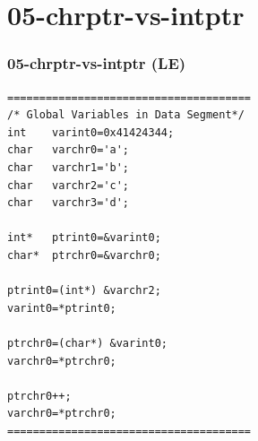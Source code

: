 \documentclass[xcolor=table, notheorems, hyperref={pdfpagelabels=false}]{beamer}
\begin{document}
\begin{frame}[fragile]
\begin{minipage}[t]{120mm}
\end{minipage}

\end{frame}

\section{05-chrptr-vs-intptr}
\begin{frame}[fragile]

\frametitle{05-chrptr-vs-intptr (LE)}
\begin{lstlisting}[basicstyle=\ttfamily\footnotesize]
======================================
/* Global Variables in Data Segment*/
int    varint0=0x41424344;
char   varchr0='a';
char   varchr1='b';
char   varchr2='c';
char   varchr3='d';

int*   ptrint0=&varint0;
char*  ptrchr0=&varchr0;

ptrint0=(int*) &varchr2;
varint0=*ptrint0;

ptrchr0=(char*) &varint0;
varchr0=*ptrchr0;

ptrchr0++;
varchr0=*ptrchr0;
======================================
\end{lstlisting}

\end{frame}
\end{document}
